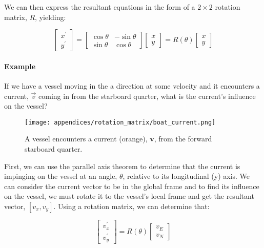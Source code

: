 We can then express the resultant equations in the form of a $2 \times 2$ rotation matrix, $R$, yielding:

\begin{equation*}
    \left[
        \begin{matrix}
            x^{\prime} \\ 
            y^{\prime}
        \end{matrix}
    \right]
    =
    \left[
        \begin{matrix}
            \cos\theta & -\sin\theta \\
            \sin\theta & \cos\theta
        \end{matrix}
    \right]
    \left[
        \begin{matrix}
            x \\
            y
        \end{matrix}
    \right]
    = R(\theta)
    \left[
        \begin{matrix}
            x \\
            y
        \end{matrix}
    \right]
\end{equation*}

\paragraph*{Example} If we have a vessel moving in the a direction at some velocity and it encounters a current, $\vec{v}$ coming in from the starboard quarter, what is the current's influence on the vessel?

\begin{figure}[h!]
    \caption{A vessel encounters a current (orange), $\pmb{v}$, from the forward starboard quarter.}
    \centering
    \texttt{[image: appendices/rotation\_matrix/boat\_current.png]}
\end{figure}

First, we can use the parallel axis theorem to determine that the current is impinging on the vessel at an angle, $\theta$, relative to its longitudinal (y) axis.
We can consider the current vector to be in the global frame and to find its influence on the vessel, we must rotate it to the vessel's local frame and get the resultant vector, $[v_x, v_y]$.
Using a rotation matrix, we can determine that:

\begin{equation*}
    \left[
        \begin{matrix}
            v_x^{\prime} \\
            v_y^{\prime}
        \end{matrix}
    \right] = 
    R(\theta) \left[
        \begin{matrix}
            v_E \\
            v_N
        \end{matrix}
    \right]
\end{equation*}

